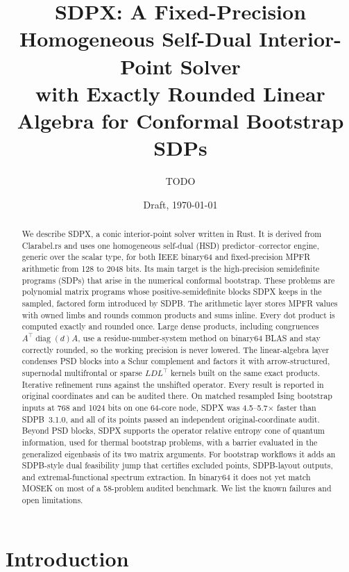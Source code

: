 \documentclass[11pt]{article}
\title{SDPX: A Fixed-Precision Homogeneous Self-Dual Interior-Point Solver\\
with Exactly Rounded Linear Algebra for Conformal Bootstrap SDPs}
\author{TODO}
\date{Draft, \today}
\begin{document}
\maketitle

\begin{abstract}
We describe SDPX, a conic interior-point solver written in Rust. It is derived
from Clarabel.rs and uses one homogeneous self-dual (HSD) predictor--corrector
engine, generic over the scalar type, for both IEEE binary64 and fixed-precision
MPFR arithmetic from 128 to 2048 bits. Its main target is the high-precision
semidefinite programs (SDPs) that arise in the numerical conformal bootstrap.
These problems are polynomial matrix programs whose positive-semidefinite
blocks SDPX keeps in the sampled, factored form introduced by SDPB. The
arithmetic layer stores MPFR values with owned limbs and rounds common
products and sums inline. Every dot product is computed exactly and rounded
once. Large dense products, including congruences $A^\top \operatorname{diag}(d) A$,
use a residue-number-system method on binary64 BLAS and stay correctly rounded,
so the working precision is never lowered. The linear-algebra layer condenses
PSD blocks into a Schur complement and factors it with arrow-structured,
supernodal multifrontal or sparse $LDL^\top$ kernels built on the same exact
products. Iterative refinement runs against the unshifted operator. Every
result is reported in original coordinates and can be audited there. On
matched resampled Ising bootstrap inputs at 768 and 1024 bits on one 64-core
node, SDPX was 4.5--5.7$\times$ faster than SDPB~3.1.0, and all of its points
passed an independent original-coordinate audit. Beyond PSD blocks, SDPX
supports the operator relative entropy cone of quantum information, used for
thermal bootstrap problems, with a barrier evaluated in the generalized
eigenbasis of its two matrix arguments. For bootstrap workflows it adds an
SDPB-style dual feasibility jump that certifies excluded points, SDPB-layout
outputs, and extremal-functional spectrum extraction. In binary64 it does not yet match
MOSEK on most of a 58-problem audited benchmark. We list the known failures
and open limitations.
\end{abstract}

\section{Introduction}
\label{sec:intro}
\end{document}
